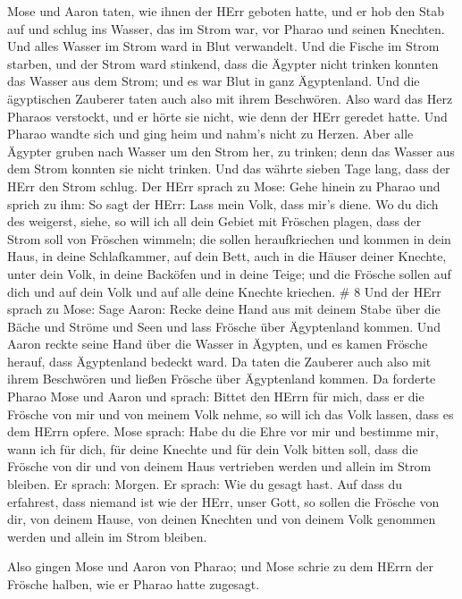  Mose und Aaron taten, wie ihnen der HErr geboten hatte,
und er hob den Stab auf und schlug ins Wasser, das im Strom war, vor
Pharao und seinen Knechten. Und alles Wasser im Strom ward in Blut
verwandelt.  Und die Fische im Strom starben, und der Strom
ward stinkend, dass die Ägypter nicht trinken konnten das Wasser aus dem
Strom; und es war Blut in ganz Ägyptenland.  Und die
ägyptischen Zauberer taten auch also mit ihrem Beschwören. Also ward das
Herz Pharaos verstockt, und er hörte sie nicht, wie denn der HErr
geredet hatte.  Und Pharao wandte sich und ging heim und
nahm's nicht zu Herzen.  Aber alle Ägypter gruben nach
Wasser um den Strom her, zu trinken; denn das Wasser aus dem Strom
konnten sie nicht trinken.  Und das währte sieben Tage
lang, dass der HErr den Strom schlug.  Der HErr sprach zu
Mose: Gehe hinein zu Pharao und sprich zu ihm: So sagt der HErr: Lass
mein Volk, dass mir's diene.  Wo du dich des weigerst,
siehe, so will ich all dein Gebiet mit Fröschen plagen, 
dass der Strom soll von Fröschen wimmeln; die sollen heraufkriechen und
kommen in dein Haus, in deine Schlafkammer, auf dein Bett, auch in die
Häuser deiner Knechte, unter dein Volk, in deine Backöfen und in deine
Teige;  und die Frösche sollen auf dich und auf dein Volk
und auf alle deine Knechte kriechen. \# 8  Und der HErr
sprach zu Mose: Sage Aaron: Recke deine Hand aus mit deinem Stabe über
die Bäche und Ströme und Seen und lass Frösche über Ägyptenland kommen.
 Und Aaron reckte seine Hand über die Wasser in Ägypten, und
es kamen Frösche herauf, dass Ägyptenland bedeckt ward.  Da
taten die Zauberer auch also mit ihrem Beschwören und ließen Frösche
über Ägyptenland kommen.  Da forderte Pharao Mose und Aaron
und sprach: Bittet den HErrn für mich, dass er die Frösche von mir und
von meinem Volk nehme, so will ich das Volk lassen, dass es dem HErrn
opfere.  Mose sprach: Habe du die Ehre vor mir und bestimme
mir, wann ich für dich, für deine Knechte und für dein Volk bitten soll,
dass die Frösche von dir und von deinem Haus vertrieben werden und
allein im Strom bleiben.  Er sprach: Morgen. Er sprach: Wie
du gesagt hast. Auf dass du erfahrest, dass niemand ist wie der HErr,
unser Gott,  so sollen die Frösche von dir, von deinem
Hause, von deinen Knechten und von deinem Volk genommen werden und
allein im Strom bleiben.

 Also gingen Mose und Aaron von Pharao; und Mose schrie zu
dem HErrn der Frösche halben, wie er Pharao hatte zugesagt.

